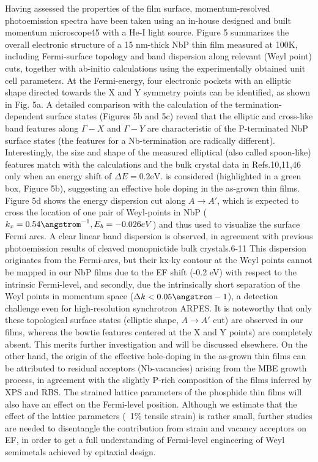 Having assessed the properties of the film surface, momentum-resolved 
photoemission spectra have been taken using an in-house designed and built 
momentum microscope45 with a He-I light source. Figure 5 summarizes the
overall electronic structure of a 15 nm-thick NbP thin film measured at 
100K, including Fermi-surface topology and band dispersion along relevant 
(Weyl point) cuts, together with ab-initio calculations using the experimentally 
obtained unit cell parameters. At the Fermi-energy, four electronic pockets with 
an elliptic shape directed towards the X and Y symmetry points can be identified, 
as shown in Fig. 5a.  A detailed comparison with the calculation of the 
termination-dependent surface states (Figures 5b and 5c) reveal that the elliptic 
and cross-like band features along $\Gamma-X$ and $\Gamma-Y$ are characteristic of the P-terminated 
NbP surface states (the features for a Nb-termination are radically different). 
Interestingly, the size and shape of the measured elliptical (also called spoon-like) 
features match with the calculations and the bulk crystal data in Refs.10,11,46 only 
when an energy shift of $\Delta E = 0.2 \text{eV}$. is considered (highlighted 
in a green box, Figure 5b), suggesting an effective hole doping in the as-grown 
thin films.  Figure 5d shows the energy dispersion cut along $A \rightarrow A'$, 
which is expected to cross the location of one pair of Weyl-points in NbP 
($k_x=0.54 \angstrom^{-1}, E_b = -0.026 eV$) and thus used to visualize the surface 
Fermi arcs. A clear linear band dispersion is observed, in agreement with previous 
photoemission results of cleaved monopnictide bulk crystals.6-11  This dispersion 
originates from the Fermi-arcs, but their kx-ky contour at the Weyl points cannot 
be mapped in our NbP films due to the EF shift (-0.2 eV) with respect to the intrinsic 
Fermi-level, and secondly, due the intrinsically short separation of the Weyl points 
in momentum space ($\Delta k < 0.05 \angstrom-1$), a detection challenge even for high-resolution 
synchrotron ARPES. It is noteworthy that only these topological surface states (elliptic 
shape, $A \rightarrow A'$ cut) are observed in our films, whereas the bowtie features
centered at the X and Y points) are completely absent.  This merits further investigation
and will be discussed elsewhere. On the other hand, the origin of the effective hole-doping 
in the as-grown thin films can be attributed to residual acceptors (Nb-vacancies) arising 
from the MBE growth process, in agreement with the slightly P-rich composition of the films 
inferred by XPS and RBS.  The strained lattice parameters of the phosphide thin films 
will also have an effect on the Fermi-level position. Although we estimate that the effect 
of the lattice parameters (~1\% tensile strain) is rather small, further studies are needed 
to disentangle the contribution from strain and vacancy acceptors on EF, in order to get a 
full understanding of Fermi-level engineering of Weyl semimetals achieved by epitaxial design.
